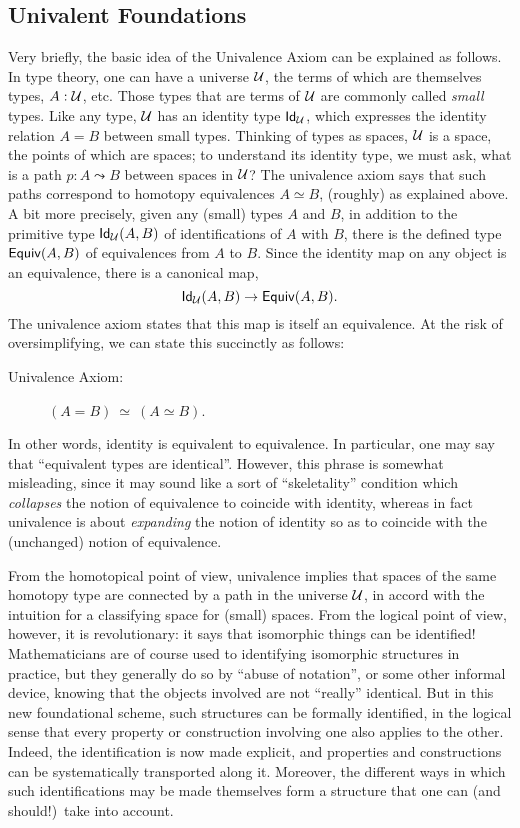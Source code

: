 \subsection*{Univalent Foundations}

Very briefly, the basic idea of the Univalence Axiom can be explained as follows.
In type theory, one can have a universe $\UU$, the terms of which are themselves types, $A : \UU$, etc.
Those types that are terms of $\UU$ are commonly called \emph{small} types.
Like any type, $\UU$ has an identity type $\idtypevar{\UU}$, which expresses the identity relation $A = B$ between small types.
Thinking of types as spaces, $\UU$ is a space, the points of which are spaces; to understand its identity type, we must ask, what is a path $p : A \leadsto B$ between spaces in $\UU$?
The univalence axiom says that such paths correspond to homotopy equivalences $A\simeq B$, (roughly) as explained above.
A bit more precisely, given any (small) types $A$ and $B$, in addition to the primitive type $\idtype[\UU]AB$ of identifications of $A$ with $B$, there is the defined type $\texteqv AB$ of equivalences from $A$ to $B$.
Since the identity map on any object is an equivalence, there is a canonical map,
\[\idtype[\UU]AB\to\texteqv AB.\]
The univalence axiom states that this map is itself an equivalence.
At the risk of oversimplifying, we can state this succinctly as follows:

\begin{description}
\item[Univalence Axiom:]  $(A = B)\ \simeq\ (A\simeq B)$.
\end{description}
%
In other words, identity is equivalent to equivalence. 
In particular, one may say that ``equivalent types are identical''.
However, this phrase is somewhat misleading, since it may sound like a sort of ``skeletality'' condition which \emph{collapses} the notion of equivalence to coincide with identity, whereas in fact univalence is about \emph{expanding} the notion of identity so as to coincide with the (unchanged) notion of equivalence.

From the homotopical point of view, univalence implies that spaces of the same homotopy type are connected by a path in the universe $\UU$, in accord with the intuition for a classifying space for (small) spaces.
From the logical point of view, however, it is revolutionary: it says that isomorphic things can be identified!  Mathematicians are of course used to identifying isomorphic structures in practice, but they generally do so by ``abuse of notation'', or some other informal device, knowing that the objects involved are not ``really'' identical.  But in this new foundational scheme, such structures can be formally identified, in the logical sense that every property or construction involving one also applies to the other. Indeed, the identification is now made explicit, and properties and constructions can be systematically transported along it.  Moreover, the different ways in which such identifications may be made themselves form a structure that one can (and should!)\ take into account.


